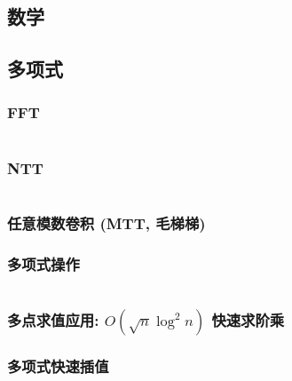 \documentclass[a4paper, twoside]{article}
\begin{document}
	\begin{multicols}{2}
		\section{数学}
			
			\subsection{多项式}
				\subsubsection{FFT}
					\inputminted{cpp}{../src/math/FFT.cpp}

				\subsubsection{NTT}
					\inputminted{cpp}{../src/math/NTT.cpp}

				\subsubsection{任意模数卷积 (MTT, 毛梯梯)}
					
			
				\subsubsection{多项式操作}
					\label{PolyOperation}
					\inputminted{cpp}{../src/math/多项式操作.cpp}
				
				\subsubsection{多点求值应用: $O(\sqrt n \log^2 n)$ 快速求阶乘}
					\label{fastfact}
					


				\subsubsection{多项式快速插值}
					


\end{multicols}
\end{document}
